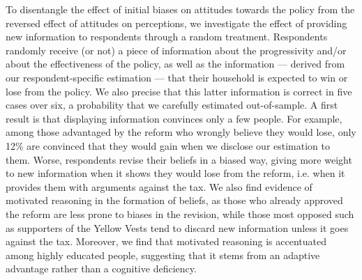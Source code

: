 \documentclass[11pt]{article}
\begin{document}
To disentangle the effect of initial biases on attitudes towards the policy from the reversed effect of attitudes on perceptions, we investigate the effect of providing new information to respondents through a random treatment. Respondents randomly receive (or not) a piece of information about the progressivity and/or about the effectiveness of the policy, as well as the information --- derived from our respondent-specific estimation --- that their household is expected to win or lose from the policy. We also precise that this latter information is correct in five cases over six, a probability that we carefully estimated out-of-sample. A first result is that displaying information convinces only a few people. For example, among those advantaged by the reform who wrongly believe they would lose, only 12\% are convinced that they would gain when we disclose our estimation to them. Worse, respondents revise their beliefs in a biased way, giving more weight to new information when it shows they would lose from the reform, i.e. when it provides them with arguments against the tax. We also find evidence of motivated reasoning in the formation of beliefs, as those who already approved the reform are less prone to biases in the revision, while those most opposed such as supporters of the Yellow Vests tend to discard new information unless it goes against the tax. Moreover, we find that motivated reasoning is accentuated among highly educated people, suggesting that it stems from an adaptive advantage rather than a cognitive deficiency.
\end{document}
